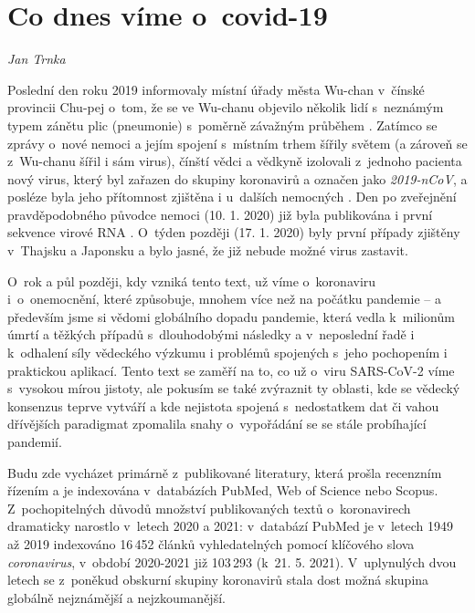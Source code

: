 \chapter{Co dnes víme o~covid-19} \label{Co_se_vi}

\textit{Jan Trnka}
\vspace{15mm}

\noindent Poslední den roku 2019 informovaly místní úřady města Wu-chan v~čínské provincii Chu-pej o~tom, že se ve Wu-chanu objevilo několik lidí s~neznámým typem zánětu plic (pneumonie) s~poměrně závažným průběhem \cite{Gralinski:2020}. Zatímco se zprávy o~nové nemoci a jejím spojení s~místním trhem šířily světem (a zároveň se z~Wu-chanu šířil i sám virus), čínští vědci a vědkyně izolovali z~jednoho pacienta nový virus, který byl zařazen do skupiny koronavirů a označen jako \textit{2019-nCoV}, a posléze byla jeho přítomnost zjištěna i u~dalších nemocných \cite{WHO:2020a}. Den po zveřejnění pravděpodobného původce nemoci (10. 1. 2020) již byla publikována i první sekvence virové RNA \cite{Zhang:2020a}. O~týden později (17. 1. 2020) byly první případy zjištěny v~Thajsku a Japonsku a bylo jasné, že již nebude možné virus zastavit.

O~rok a půl později, kdy vzniká tento text, už víme o~koronaviru \newcommand{\scod}{\mbox{SARS-CoV-2}\xpspace}i~o~onemocnění, které způsobuje, mnohem více než na počátku pandemie -- a pře\-de\-vším jsme si vědomi globálního dopadu pandemie, která vedla k~milionům úmrtí a těžkých případů s~dlouhodobými následky a v~neposlední řadě i k~odhalení síly vědeckého výzkumu i problémů spojených s~jeho pochopením i praktickou aplikací. Tento text se zaměří na to, co už o~viru SARS-CoV-2 víme s~vysokou mírou jistoty, ale pokusím se také zvýraznit ty oblasti, kde se vědecký konsenzus teprve vytváří a kde nejistota spojená s~nedostatkem dat či vahou dřívějších paradigmat zpomalila snahy o~vypořádání se se stále probíhající pandemií.

Budu zde vycházet primárně z~publikované literatury, která prošla recenzním řízením a je indexována v~databázích PubMed, Web of Science nebo Scopus. Z~pochopitelných důvodů množství publikovaných textů o~koronavirech dramaticky narostlo v~letech 2020 a 2021: v~databází PubMed je v~letech 1949 až 2019 indexováno 16\,452 článků vyhledatelných pomocí klíčového slova \textit{coronavirus}, v~období 2020-2021 již 103\,293 (k~21. 5. 2021). V~uplynulých dvou letech se z~poněkud obskurní skupiny koronavirů stala dost možná skupina globálně nejznámější a nejzkoumanější.

